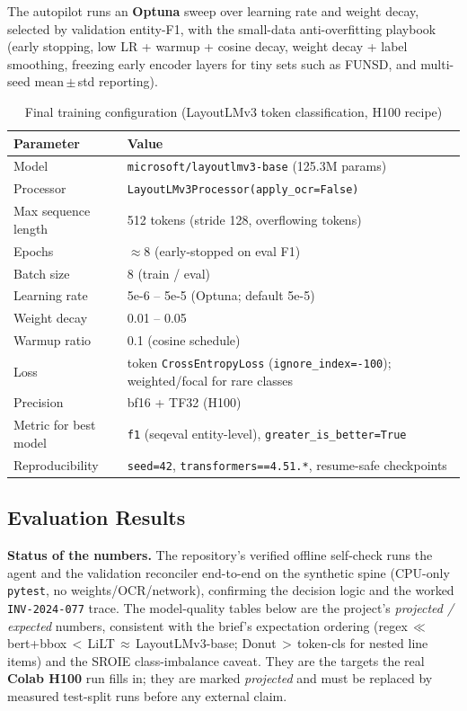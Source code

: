 \documentclass[12pt,a4paper]{article}
\begin{document}
The autopilot runs an \textbf{Optuna} sweep over learning rate and weight decay, selected
by validation entity-F1, with the small-data anti-overfitting playbook (early stopping,
low LR + warmup + cosine decay, weight decay + label smoothing, freezing early encoder
layers for tiny sets such as FUNSD, and multi-seed mean\,$\pm$\,std reporting).

\begin{table}[H]
\centering
\caption{Final training configuration (LayoutLMv3 token classification, H100 recipe)}
\begin{tabular}{ll}
\toprule
\textbf{Parameter} & \textbf{Value} \\
\midrule
Model & \texttt{microsoft/layoutlmv3-base} (125.3M params) \\
Processor & \texttt{LayoutLMv3Processor(apply\_ocr=False)} \\
Max sequence length & 512 tokens (stride 128, overflowing tokens) \\
Epochs & $\approx$8 (early-stopped on eval F1) \\
Batch size & 8 (train / eval) \\
Learning rate & 5e-6 -- 5e-5 (Optuna; default 5e-5) \\
Weight decay & 0.01 -- 0.05 \\
Warmup ratio & 0.1 (cosine schedule) \\
Loss & token \texttt{CrossEntropyLoss} (\texttt{ignore\_index=-100}); weighted/focal for rare classes \\
Precision & bf16 + TF32 (H100) \\
Metric for best model & \texttt{f1} (seqeval entity-level), \texttt{greater\_is\_better=True} \\
Reproducibility & \texttt{seed=42}, \texttt{transformers==4.51.*}, resume-safe checkpoints \\
\bottomrule
\end{tabular}
\end{table}

\subsection{Evaluation Results}

\noindent\textbf{Status of the numbers.} The repository's verified offline self-check
runs the agent and the validation reconciler end-to-end on the synthetic spine
(CPU-only \texttt{pytest}, no weights/OCR/network), confirming the decision logic and the
worked \texttt{INV-2024-077} trace. The model-quality tables below are the project's
\emph{projected / expected} numbers, consistent with the brief's expectation ordering
(regex\,$\ll$\,bert+bbox\,$<$\,LiLT\,$\approx$\,LayoutLMv3-base; Donut\,$>$\,token-cls for
nested line items) and the SROIE class-imbalance caveat. They are the targets the real
\textbf{Colab H100} run fills in; they are marked \emph{projected} and must be replaced
by measured test-split runs before any external claim.
\end{document}
